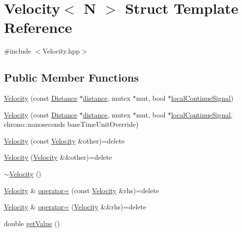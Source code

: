 \hypertarget{struct_velocity}{\section{Velocity$<$ N $>$ Struct Template Reference}
\label{struct_velocity}
}


{\ttfamily \#include $<$Velocity.\-hpp$>$}

\subsection*{Public Member Functions}
\begin{DoxyCompactItemize}
\item 
\hyperlink{struct_velocity_a5a7fc681247a544a000718a35c202958}{Velocity} (const \hyperlink{_velocity_8hpp_a29fbe3dd3ce308a36d5b29488daddcaa}{Distance} $\ast$\hyperlink{struct_velocity_a3f3d268a5d9452ad912c19cfcc7c0394}{distance}, mutex $\ast$mut, bool $\ast$\hyperlink{struct_velocity_a099e0c3e044ce52e11b1e7ab225f896c}{local\-Continue\-Signal})
\item 
\hyperlink{struct_velocity_ab501061b7933ea4bf8d722b5e092972a}{Velocity} (const \hyperlink{_velocity_8hpp_a29fbe3dd3ce308a36d5b29488daddcaa}{Distance} $\ast$\hyperlink{struct_velocity_a3f3d268a5d9452ad912c19cfcc7c0394}{distance}, mutex $\ast$mut, bool $\ast$\hyperlink{struct_velocity_a099e0c3e044ce52e11b1e7ab225f896c}{local\-Continue\-Signal}, chrono\-::nanoseconds base\-Time\-Unit\-Override)
\item 
\hyperlink{struct_velocity_a8763237baab85450aeadd2f1df96c6ec}{Velocity} (const \hyperlink{struct_velocity}{Velocity} \&other)=delete
\item 
\hyperlink{struct_velocity_a5311e10fd1ff6dff1656507d5a7d3d19}{Velocity} (\hyperlink{struct_velocity}{Velocity} \&\&other)=delete
\item 
\hyperlink{struct_velocity_a328da698ec2f9cbf0de0ab519b6d7f50}{$\sim$\-Velocity} ()
\item 
\hyperlink{struct_velocity}{Velocity} \& \hyperlink{struct_velocity_a46e6358260ffa948eb21b1e235960e56}{operator=} (const \hyperlink{struct_velocity}{Velocity} \&rhs)=delete
\item 
\hyperlink{struct_velocity}{Velocity} \& \hyperlink{struct_velocity_a0b9ef6d1f184b6012a2dcc3b7a65539e}{operator=} (\hyperlink{struct_velocity}{Velocity} \&\&rhs)=delete
\item 
double \hyperlink{struct_velocity_a39c1fe5e6fc453aa435a648d6ce5ef05}{get\-Value} ()
\end{DoxyCompactItemize}
